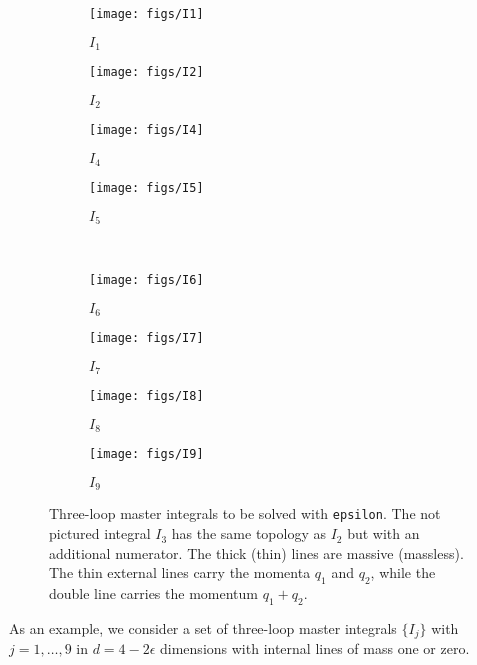 \documentclass[12pt]{article}
\numberwithin{equation}{section}
\numberwithin{figure}{section}
\begin{document}
    \begin{figure}
      \centering
      \begin{subfigure}[b]{.24\textwidth}
        \centering
        \texttt{[image: figs/I1]}
        \caption*{$I_1$}
      \end{subfigure}%
      \begin{subfigure}[b]{.24\textwidth}
        \centering
        \texttt{[image: figs/I2]}
        \caption*{$I_2$}
      \end{subfigure}%
      \begin{subfigure}[b]{.24\textwidth}
        \centering
        \texttt{[image: figs/I4]}
        \caption*{$I_4$}
      \end{subfigure}%
      \begin{subfigure}[b]{.24\textwidth}
        \centering
        \texttt{[image: figs/I5]}
        \caption*{$I_5$}
      \end{subfigure} \\
      \begin{subfigure}[b]{.24\textwidth}
        \centering
        \texttt{[image: figs/I6]}
        \caption*{$I_6$}
      \end{subfigure}%
      \begin{subfigure}[b]{.24\textwidth}
        \centering
        \texttt{[image: figs/I7]}
        \caption*{$I_7$}
      \end{subfigure}%
      \begin{subfigure}[b]{.24\textwidth}
        \centering
        \texttt{[image: figs/I8]}
        \caption*{$I_8$}
      \end{subfigure}%
      \begin{subfigure}[b]{.24\textwidth}
        \centering
        \texttt{[image: figs/I9]}
        \caption*{$I_9$}
      \end{subfigure}
      \caption{ \label{fig:example}
        Three-loop master integrals to be solved with \texttt{epsilon}. 
        The not pictured integral $I_3$ has the same topology as $I_2$ but with an additional numerator.
        The thick (thin) lines are massive (massless).
        The thin external lines carry the momenta $q_1$ and $q_2$, while the double line carries the momentum $q_1+q_2$.
      }
    \end{figure}
    As an example, we consider a set of three-loop master integrals $\{I_j\}$ with $j=1,\dots,9$ in $d=4-2\epsilon$ dimensions with internal lines of mass one or zero.
\end{document}
